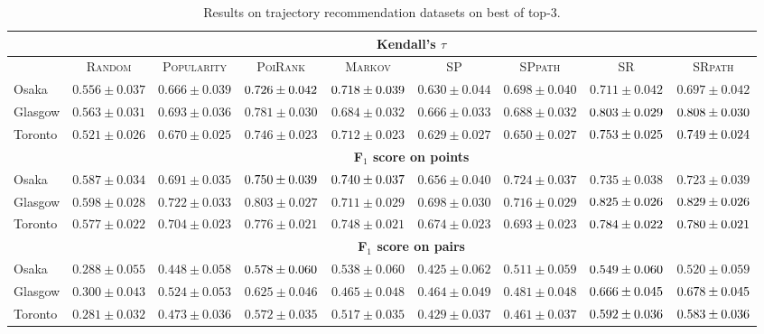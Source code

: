 \begin{table*}[!h]
\centering
\small
\setlength{\tabcolsep}{3pt} %
\begin{tabular}{l|cc|ccc|ccc} \hline
& \multicolumn{8}{c}{\bf Kendall's $\tau$} \\ \hline
 & \textsc{Random} & \textsc{Popularity} & \textsc{PoiRank} & \textsc{Markov} & \textsc{SP} & \textsc{SPpath} & \textsc{SR} & \textsc{SRpath} \\ \hline
Osaka & $0.556\pm0.037$ & $0.666\pm0.039$ & $\cellcolor{green!25}{0.726\pm0.042}$ & $\cellcolor{yellow!25}{0.718\pm0.039}$ & $0.630\pm0.044$ & $0.698\pm0.040$ & $0.711\pm0.042$ & $0.697\pm0.042$ \\
Glasgow & $0.563\pm0.031$ & $0.693\pm0.036$ & $0.781\pm0.030$ & $0.684\pm0.032$ & $0.666\pm0.033$ & $0.688\pm0.032$ & $\cellcolor{yellow!25}{0.803\pm0.029}$ & $\cellcolor{green!25}{0.808\pm0.030}$ \\
Toronto & $0.521\pm0.026$ & $0.670\pm0.025$ & $0.746\pm0.023$ & $0.712\pm0.023$ & $0.629\pm0.027$ & $0.650\pm0.027$ & $\cellcolor{green!25}{0.753\pm0.025}$ & $\cellcolor{yellow!25}{0.749\pm0.024}$ \\
\hline
& \multicolumn{8}{c}{\bf F$_1$ score on points} \\ \hline
Osaka & $0.587\pm0.034$ & $0.691\pm0.035$ & $\cellcolor{green!25}{0.750\pm0.039}$ & $\cellcolor{yellow!25}{0.740\pm0.037}$ & $0.656\pm0.040$ & $0.724\pm0.037$ & $0.735\pm0.038$ & $0.723\pm0.039$ \\
Glasgow & $0.598\pm0.028$ & $0.722\pm0.033$ & $0.803\pm0.027$ & $0.711\pm0.029$ & $0.698\pm0.030$ & $0.716\pm0.029$ & $\cellcolor{yellow!25}{0.825\pm0.026}$ & $\cellcolor{green!25}{0.829\pm0.026}$ \\
Toronto & $0.577\pm0.022$ & $0.704\pm0.023$ & $0.776\pm0.021$ & $0.748\pm0.021$ & $0.674\pm0.023$ & $0.693\pm0.023$ & $\cellcolor{green!25}{0.784\pm0.022}$ & $\cellcolor{yellow!25}{0.780\pm0.021}$ \\
\hline
& \multicolumn{8}{c}{\bf F$_1$ score on pairs} \\ \hline
Osaka & $0.288\pm0.055$ & $0.448\pm0.058$ & $\cellcolor{green!25}{0.578\pm0.060}$ & $0.538\pm0.060$ & $0.425\pm0.062$ & $0.511\pm0.059$ & $\cellcolor{yellow!25}{0.549\pm0.060}$ & $0.520\pm0.059$ \\
Glasgow & $0.300\pm0.043$ & $0.524\pm0.053$ & $0.625\pm0.046$ & $0.465\pm0.048$ & $0.464\pm0.049$ & $0.481\pm0.048$ & $\cellcolor{yellow!25}{0.666\pm0.045}$ & $\cellcolor{green!25}{0.678\pm0.045}$ \\
Toronto & $0.281\pm0.032$ & $0.473\pm0.036$ & $0.572\pm0.035$ & $0.517\pm0.035$ & $0.429\pm0.037$ & $0.461\pm0.037$ & $\cellcolor{green!25}{0.592\pm0.036}$ & $\cellcolor{yellow!25}{0.583\pm0.036}$ \\
\hline
\end{tabular}
\caption{Results on trajectory recommendation datasets on best of top-3.}
\end{table*}


